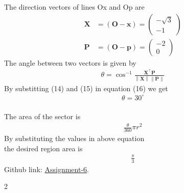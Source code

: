 \documentclass[10pt,a4paper]{report}
\providecommand{\norm}[1]{\left\lVert#1\right\rVert}
\newcommand{\myvec}[1]{\ensuremath{\begin{pmatrix}#1\end{pmatrix}}}
\let\vec\mathbf
\begin{document}
\begin{multicols}{2}
			The direction vectors of lines Ox and Op are \\
	\begin{align}
		\vec {X} &=(\vec {O-x})=\myvec{-\sqrt{3} \\ -1} \\
		\vec {P} &=(\vec {O-p})=\myvec{-2 \\ 0}
	\end{align}
The angle between two vectors is given by
\begin{align}
	\theta =\cos^{-1}  \frac{\vec {X^{\top}P}}{\norm{\vec X}\norm{\vec P}}
\end{align}
By substitting (14) and (15) in equation (16) we get 
\begin{align}
	\theta=30^\circ
\end{align} \\
The area of the sector is \\
\begin{align}
	{\frac{\theta}{360}}\pi r^2
\end{align}
By substituting the values in above equation \\
the desired region  area is
\begin{align}
	\frac{\pi}{3}
\end{align}
\vspace{5mm}
Github link: \href{https://github.com/Prathyushakorepu/FWC/tree/main/Matrix/Conic}{Assignment-6}.

\end{multicols}{2}
\end{document}
